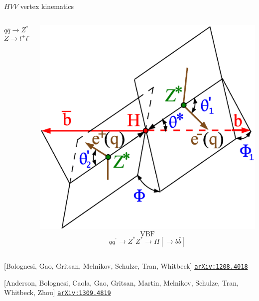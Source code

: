\documentclass[usenames,dvipsnames,svgnames,table]{beamer}
\newcommand{\arxiv}[1]{\href{http://arxiv.org/abs/#1}{\nolinkurl{arXiv:#1}}}
\begin{document}
\begin{frame}{$HVV$ vertex kinematics}
\begin{columns}
\begin{column}{0.33\textwidth}
\[q\bar{q}\to Z^*\to ZH\]
\[Z\to l^+l^- \left[H\to b\bar{b}\right]\]
\end{column}
\begin{column}{0.33\textwidth} \centering
\includegraphics[width=\columnwidth]{snowmass/angles-HZZVBF} \\
\[\text{VBF}\]
\[qq^\prime\to Z^*Z^*\to H\left[\to b\bar{b}\right]\]
\end{column}
\end{columns}
\vfill
\scriptsize
[Bolognesi, Gao, Gritsan, Melnikov, Schulze, Tran, Whitbeck] \arxiv{1208.4018}

[Anderson, Bolognesi, Caola, Gao, Gritsan, Martin, Melnikov, Schulze, Tran, Whitbeck, Zhou] \arxiv{1309.4819}

\end{frame}
\end{document}
